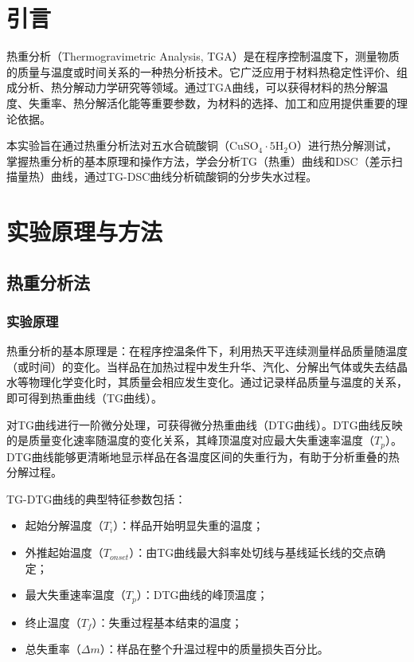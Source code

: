 
\section{引\hspace{1em}言}

热重分析（Thermogravimetric Analysis, TGA）是在程序控制温度下，测量物质的质量与温度或时间关系的一种热分析技术。它广泛应用于材料热稳定性评价、组成分析、热分解动力学研究等领域。通过TGA曲线，可以获得材料的热分解温度、失重率、热分解活化能等重要参数，为材料的选择、加工和应用提供重要的理论依据。

本实验旨在通过热重分析法对五水合硫酸铜（$\mathrm{CuSO_4 \cdot 5H_2O}$）进行热分解测试，掌握热重分析的基本原理和操作方法，学会分析TG（热重）曲线和DSC（差示扫描量热）曲线，通过TG-DSC曲线分析硫酸铜的分步失水过程。

\section{实验原理与方法}

\subsection{热重分析法}

\subsubsection{实验原理}

热重分析的基本原理是：在程序控温条件下，利用热天平连续测量样品质量随温度（或时间）的变化。当样品在加热过程中发生升华、汽化、分解出气体或失去结晶水等物理化学变化时，其质量会相应发生变化。通过记录样品质量与温度的关系，即可得到热重曲线（TG曲线）。

对TG曲线进行一阶微分处理，可获得微分热重曲线（DTG曲线）。DTG曲线反映的是质量变化速率随温度的变化关系，其峰顶温度对应最大失重速率温度（$T_p$）。DTG曲线能够更清晰地显示样品在各温度区间的失重行为，有助于分析重叠的热分解过程。

TG-DTG曲线的典型特征参数包括：
\begin{itemize}
    \item 起始分解温度（$T_i$）：样品开始明显失重的温度；
    \item 外推起始温度（$T_{onset}$）：由TG曲线最大斜率处切线与基线延长线的交点确定；
    \item 最大失重速率温度（$T_p$）：DTG曲线的峰顶温度；
    \item 终止温度（$T_f$）：失重过程基本结束的温度；
    \item 总失重率（$\Delta m$）：样品在整个升温过程中的质量损失百分比。
\end{itemize}

